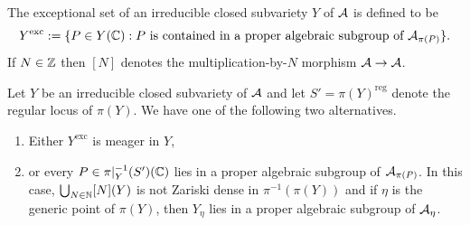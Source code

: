 \documentclass[12pt,oneside]{amsart}
\begin{document}
The exceptional set of an irreducible closed subvariety $Y$ of $\mathcal{A}$ is defined to be
\begin{equation}
  \label{eq:exceptionalset}
  Y^{\mathrm{exc}}:=     %
  \{P \in Y(\IC) :  \text{$P$ is  contained in a proper algebraic
    subgroup of $\cA_{\pi(P)}$}\}.
\end{equation}
If $N\in{\mathbb{Z}}$ then $[N]$ denotes the multiplication-by-$N$ morphism
$\mathcal{A}\rightarrow\mathcal{A}$. 
\begin{lemma}
  \label{lem:alternative}
  Let $Y$ be an irreducible closed subvariety of $\mathcal{A}$ and 
  let $S' =\pi(Y)^{\mathrm{reg}}$ denote the regular locus of $\pi(Y)$. We have
  one of the following two alternatives.
  \begin{enumerate}
  \item [(i)]
    Either $Y^{\mathrm{exc}}$ is meager in $Y$,
  \item[(ii)] or every $P\in \pi|_Y^{-1}(S')({\mathbb{C}})$ lies in a proper algebraic
    subgroup of $\mathcal{A}_{\pi(P)}$.  In this case,
     $\bigcup_{N\in{\mathbb{N}}}[N](Y)$ is not Zariski dense in $\pi^{-1}(\pi(Y))$ and if
     $\eta$ is the generic point of $\pi(Y)$, then $Y_\eta$ lies in a
     proper algebraic subgroup of $\mathcal{A}_\eta$.
  \end{enumerate}
\end{lemma}
\end{document}
